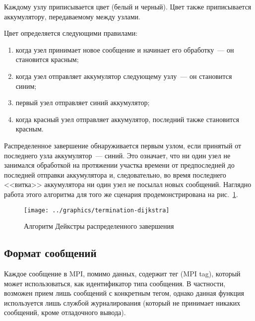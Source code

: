 \documentclass[12pt,a4paper,fleqn]{article}
\begin{document}
Каждому узлу приписывается цвет (белый и черный). Цвет также приписывается аккумулятору,
передаваемому между узлами.

Цвет определяется следующими правилами:
\begin{enumerate}
\item когда узел принимает новое сообщение и начинает его обработку~--- он становится красным;
\item когда узел отправляет аккумулятор следующему узлу~--- он становится синим;
\item первый узел отправляет синий аккумулятор;
\item когда красный узел отправляет аккумулятор, последний также становится красным.
\end{enumerate}

Распределенное завершение обнаруживается первым узлом, если принятый от последнего узла
аккумулятор~--- синий. Это означает, что ни один узел не занимался обработкой на протяжении участка
времени от предпоследней до последней отправки аккумулятора и, следовательно, во время последнего
<<витка>> аккумулятора ни один узел не посылал новых сообщений. Наглядно работа этого алгоритма для
того же сценария продемонстрирована на рис.~\ref{fig:termination-dijkstra}.

\begin{figure}[htb]
  \centering
  \texttt{[image: ../graphics/termination-dijkstra]}  
  \caption{Алгоритм Дейкстры распределенного завершения}
\label{fig:termination-dijkstra}
\end{figure}

\subsection{Формат сообщений}

Каждое сообщение в MPI, помимо данных, содержит тег (MPI tag), который может использоваться, как
идентификатор типа сообщения. В частности, возможен прием лишь сообщений с конкретным тегом, однако
данная функция используется лишь службой журналирования (который не принимает никаких сообщений,
кроме отладочного вывода).
\end{document}
